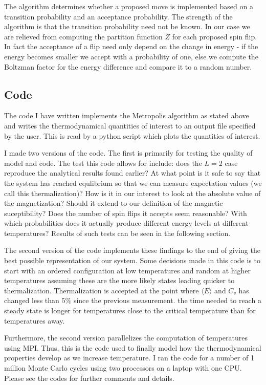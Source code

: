 \documentclass[norsk, 10pt, twocolumn, a4paper]{revtex4}
\begin{document}
The algorithm determines whether a proposed move is implemented based on a transition probability and an
acceptance probability. The strength of the algorithm is that the transition probability need not be known.
In our case we are relieved from computing the partition function $Z$ for each proposed spin flip.
In fact the acceptance of a flip need only depend on the change in energy - if the energy becomes smaller we
accept with a probability of one, else we compute the Boltzman factor for the energy difference and compare it
to a random number.

\subsection{Code}
The code I have written implements the Metropolis algorithm
as stated above and writes the thermodynamical quantities of interest to an output file specified by the user.
This is read by a python script which plots the quantities of interest.

I made two versions of the code. The first is primarily for testing the quality of model and code.
The test this code allows for include: does the
$L=2$ case reproduce the analytical results found earlier? At what point is it safe to say that
the system has reached equlibrium so that we can measure expectation values
(we call this thermalization)?
How is it in our interest to look at the absolute value of the magnetization? Should it extend to our definition
of the magnetic suceptibility?
Does the number of spin flips it accepts seem reasonable? 
With which probabilities does it actually produce different energy levels at different temperatures?
Results of such tests can be seen in the following section.

The second version of the code implements these findings to the end of giving the best possible representation of our system.
Some decisions made in this code is to start with an ordered configuration at low temperatures and random at higher temperatures
assuming these are the more likely states leading quicker to thermalization. Thermalization is accepted at the point where
$\langle E\rangle$ and $C_v$ has changed less than $5\%$ since the previous measurement.
the time needed to reach a steady state is longer for temperatures close
to the critical temperature than for temperatures away.

Furthermore, the second version parallelizes the computation of temperatures using MPI. Thus, this is the code used to finally
model how the thermodynamical properties develop as we increase temperature. I ran the code for a number of 1 million Monte Carlo
cycles using two processors on a laptop with one CPU. 
Please see the codes for further comments and details.
\end{document}
